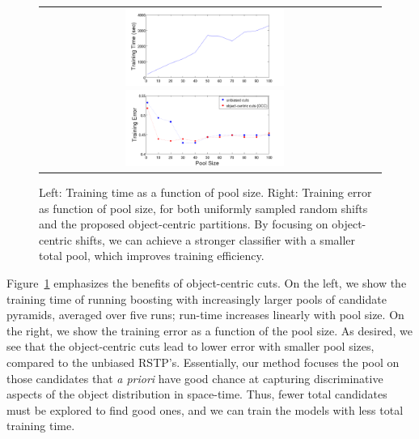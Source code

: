 \begin{figure}
  \begin{center}
  \begin{tabular}{cc}
\includegraphics[width=5.2cm]{figures/runtime.png}
\includegraphics[width=5.2cm]{figures/trainerror.png}
\end{tabular}
		   \caption{Left: Training time as a function of pool size.  Right: Training error as function of pool size, for both uniformly sampled random shifts and the proposed object-centric partitions.  By focusing on object-centric shifts, we can achieve a stronger classifier with a smaller total pool, which improves training efficiency.}\vspace*{-0.1in}\label{fig:runtime-trainerror}
  \end{center}
\end{figure}

Figure~\ref{fig:runtime-trainerror} emphasizes the benefits of object-centric cuts.  On the left, we show the training time of running boosting with increasingly larger pools of candidate pyramids, averaged over five runs; run-time increases linearly with pool size.
On the right, we show the training error as a function of the pool size.  As desired, we see that the object-centric cuts lead to lower error with smaller pool sizes, compared to the unbiased RSTP's.  Essentially, our method focuses the pool on those candidates that \emph{a priori} have good chance at capturing discriminative aspects of the object distribution in space-time.  Thus, fewer total candidates must be explored to find good ones, and we can train the models with less total training time.

